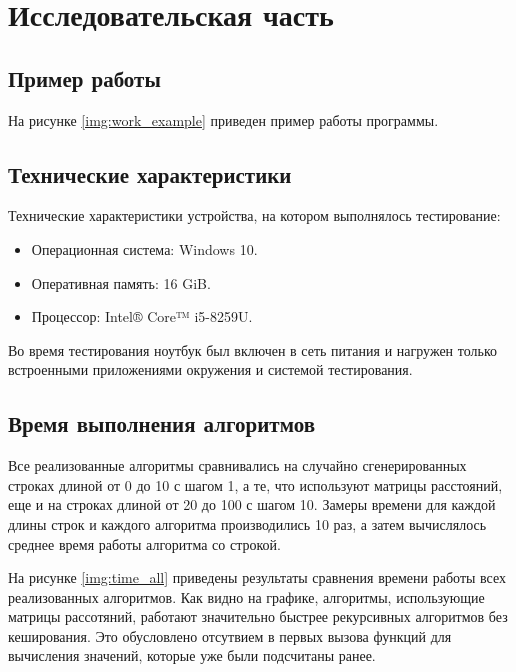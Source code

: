 \chapter{Исследовательская часть}

\section{Пример работы}

На рисунке \ref{img:work_example} приведен пример работы программы.


\section{Технические характеристики}

Технические характеристики устройства, на котором выполнялось тестирование:

\begin{itemize}
	\item Операционная система: Windows 10.
	\item Оперативная память: 16 GiB.
	\item Процессор: Intel® Core™ i5-8259U.
\end{itemize}

Во время тестирования ноутбук был включен в сеть питания и нагружен только встроенными приложениями окружения и системой тестирования.

\section{Время выполнения алгоритмов}

 Все реализованные алгоритмы сравнивались на случайно сгенерированных строках длиной от 0 до 10 с шагом 1, а те, что используют матрицы расстояний, еще и на строках длиной от 20 до 100 с шагом 10. Замеры времени для каждой длины строк и каждого алгоритма производились 10 раз, а затем вычислялось среднее время работы алгоритма со строкой.
 
На рисунке \ref{img:time_all} приведены результаты сравнения времени работы всех реализованных алгоритмов. Как видно на графике, алгоритмы, использующие матрицы рассотяний, работают значительно быстрее рекурсивных алгоритмов без кеширования. Это обусловлено отсутвием в первых вызова функций для вычисления значений, которые уже были подсчитаны ранее.


